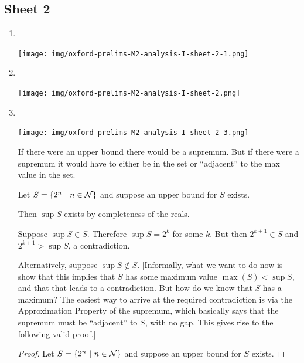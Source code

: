\newpage
\subsection{Sheet 2}

\begin{enumerate}
\item~\\
  \begin{mdframed}
    \texttt{[image: img/oxford-prelims-M2-analysis-I-sheet-2-1.png]}
  \end{mdframed}
\item~\\
  \begin{mdframed}
    \texttt{[image: img/oxford-prelims-M2-analysis-I-sheet-2.png]}
  \end{mdframed}
\item~\\
  \begin{mdframed}
    \texttt{[image: img/oxford-prelims-M2-analysis-I-sheet-2-3.png]}
  \end{mdframed}

  \begin{intuition*}
    If there were an upper bound there would be a supremum. But if there were a supremum it would
    have to either be in the set or ``adjacent'' to the max value in the set.
  \end{intuition*}

  \begin{intuition*}
    Let $S = \{2^n ~|~ n \in \mathcal{N}\}$ and suppose an upper bound for $S$ exists.

    Then $\sup S$ exists by completeness of the reals.

    Suppose $\sup S \in S$. Therefore $\sup S = 2^k$ for some $k$. But then $2^{k+1} \in S$ and
    $2^{k+1} > \sup S$, a contradiction.

    Alternatively, suppose $\sup S \not\in S$. [Informally, what we want to do now is show that
    this implies that $S$ has some maximum value $\max(S) < \sup S$, and that that leads to a
    contradiction. But how do we know that $S$ has a maximum? The easiest way to arrive at the
    required contradiction is via the Approximation Property of the supremum, which basically says
    that the supremum must be ``adjacent'' to $S$, with no gap. This gives rise to the following
    valid proof.]
  \end{intuition*}

  \begin{proof}
    Let $S = \{2^n ~|~ n \in \mathcal{N}\}$ and suppose an upper bound for $S$ exists.


\end{proof}
\end{enumerate}
